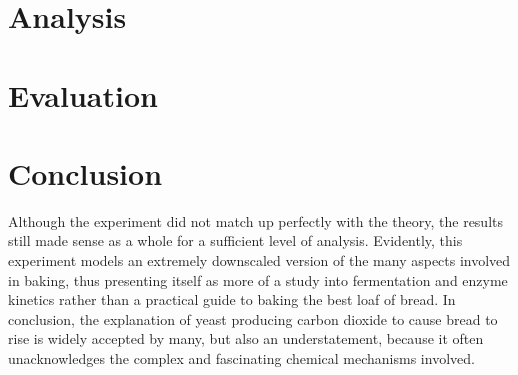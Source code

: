 \documentclass{article}
\begin{document}
\section{Analysis}

\section{Evaluation}

\section{Conclusion}
Although the experiment did not match up perfectly with the theory, the results still made sense as a whole for a sufficient level of analysis. Evidently, this experiment models an extremely downscaled version of the many aspects involved in baking, thus presenting itself as more of a study into fermentation and enzyme kinetics rather than a practical guide to baking the best loaf of bread. In conclusion, the explanation of yeast producing carbon dioxide to cause bread to rise is widely accepted by many, but also an understatement, because it often unacknowledges the complex and fascinating chemical mechanisms involved.

\nocite{*}

\newpage

\printbibliography

\newpage

\end{document}
